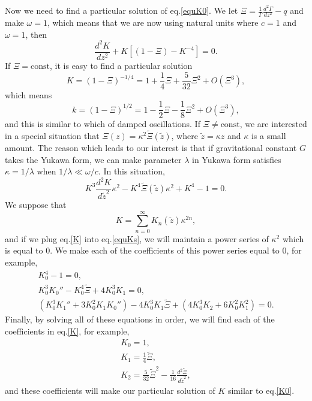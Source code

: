 \documentclass[
    jor,
    amsmath,amssymb,preprint,
    superscriptaddress,
]{revtex4-2}
\begin{document}
Now we need to find a particular solution of eq.\eqref{equK0}. We let $\Xi=\frac{1}{\Gamma}\frac{d^2\Gamma}{d z^2}-q$ and make $\omega=1$, which means that we are now using natural units where $c=1$ and $\omega=1$, then
\begin{equation}\label{equK}
    \frac{d^2 K}{d z^2}+K[(1-\Xi)-K^{-4}]=0.
\end{equation}
If $\Xi=\text{const}$, it is easy to find a particular solution
\begin{equation}\label{K0}
    K=(1-\Xi)^{-1/4}=1+\frac{1}{4}\Xi+\frac{5}{32}\Xi^2+O(\Xi^3),
\end{equation}
which means
\begin{equation}
    k=(1-\Xi)^{1/2}=1-\frac{1}{2}\Xi-\frac{1}{8}\Xi^2+O(\Xi^3),
\end{equation}
and this is similar to which of damped oscillations. If $\Xi\neq\text{const}$, we are interested in a special situation that $\Xi(z)=\kappa^2\tilde{\Xi}(\tilde{z})$, where $\tilde{z}=\kappa z$ and $\kappa$ is a small amount. The reason which leads to our interest is that if gravitational constant $G$ takes the Yukawa form, we can make parameter $\lambda$ in Yukawa form satisfies $\kappa=1/\lambda$ when $1/\lambda\ll\omega/c$. In this situation,
\begin{equation}\label{equKs}
    K^3\frac{d^2 K}{d \tilde{z}^2}\kappa^2-K^4\tilde{\Xi}(\tilde{z})\kappa^2+K^4-1=0.
\end{equation}
We suppose that
\begin{equation}\label{K}
    K=\sum_{n=0}^\infty K_n(\tilde{z})\kappa^{2n},
\end{equation}
and if we plug eq.\eqref{K} into eq.\eqref{equKs}, we will maintain a power series of $\kappa^2$ which is equal to $0$. We make each of the coefficients of this power series equal to $0$, for example,
\begin{gather}
    K_0^4-1=0,\\
    K_0^3K_0''-K_0^4\tilde{\Xi}+4K_0^3K_1=0,\\
    (K_0^3K_1''+3K_0^2K_1K_0'')-4K_0^3K_1\tilde{\Xi}+(4K_0^3K_2+6K_0^2K_1^2)=0.
\end{gather}
Finally, by solving all of these equations in order, we will find each of the coefficients in eq.\eqref{K}, for example,
\begin{gather}
    K_0=1,\\
    K_1=\frac{1}{4}\tilde{\Xi},\\
    K_2=\frac{5}{32}\tilde{\Xi}^2-\frac{1}{16}\frac{d^2\tilde{\Xi}}{d\tilde{z}^2},
\end{gather}
and these coefficients will make our particular solution of $K$ similar to eq.\eqref{K0}.


\end{document}
